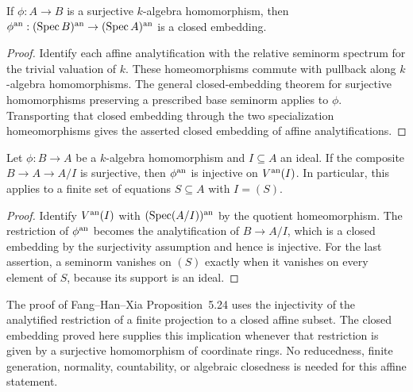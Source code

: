 \begin{lemma}\label{lem:analytic-closed-immersion}
\leanok
{}
If $\phi:A\to B$ is a surjective $k$-algebra homomorphism, then
$\phi^{\mathrm{an}}:(\operatorname{Spec} B)^{\mathrm{an}}\to(\operatorname{Spec} A)^{\mathrm{an}}$ is a closed embedding.
\end{lemma}

\begin{proof}
Identify each affine analytification with the relative seminorm spectrum for the
trivial valuation of $k$. These homeomorphisms commute with pullback along
$k$-algebra homomorphisms. The general closed-embedding theorem for surjective
homomorphisms preserving a prescribed base seminorm applies to $\phi$.
Transporting that closed embedding through the two specialization homeomorphisms
gives the asserted closed embedding of affine analytifications.
\end{proof}

\begin{corollary}\label{cor:analytic-closed-restriction-injective}
\leanok
{}
Let $\phi:B\to A$ be a $k$-algebra homomorphism and $I\subseteq A$ an ideal.
If the composite $B\to A\to A/I$ is surjective, then $\phi^{\mathrm{an}}$ is injective on
$V^{\mathrm{an}}(I)$. In particular, this applies to a finite set of equations $S\subseteq A$
with $I=(S)$.
\end{corollary}

\begin{proof}
Identify $V^{\mathrm{an}}(I)$ with $(\operatorname{Spec}(A/I))^{\mathrm{an}}$ by the quotient homeomorphism.
The restriction of $\phi^{\mathrm{an}}$ becomes the analytification of $B\to A/I$,
which is a closed embedding by the surjectivity assumption and hence is injective.
For the last assertion, a seminorm vanishes on $(S)$ exactly when it vanishes
on every element of $S$, because its support is an ideal.
\end{proof}

\begin{remark}\label{rmk:analytic-closed-immersion-use}
The proof of Fang--Han--Xia Proposition~5.24 uses the injectivity of the analytified
restriction of a finite projection to a closed affine subset. The closed embedding
proved here supplies this implication whenever that restriction is given by a
surjective homomorphism of coordinate rings. No reducedness, finite generation,
normality, countability, or algebraic closedness is needed for this affine statement.
\end{remark}
